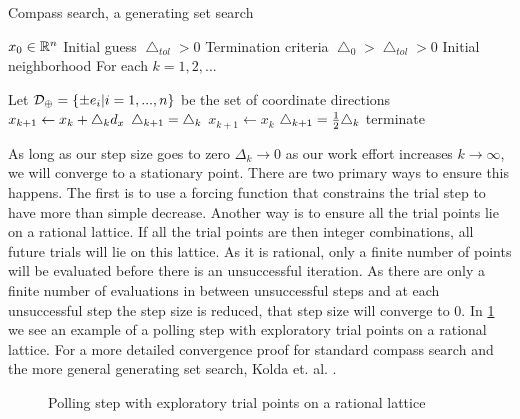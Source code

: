 \begin{algorithm}
\caption{Compass search, a generating set search}\label{dfo_genset}
\begin{algorithmic}
\State $x_0 \in \mathbb{R}^{n}$ Initial guess
\State $\bigtriangleup_{tol} >0$ Termination criteria
\State $\bigtriangleup_0 > \bigtriangleup_{tol} >0$ Initial neighborhood
\BState For each $k=1,2,...$

\State Let $\mathcal{D}_\oplus =\left\{ \pm e_i| i=1,...,n\right\}$ be the set of coordinate directions
\State $x_{k+1} \gets x_k + \bigtriangleup_k d_x$
\State $\bigtriangleup_{k+1} = \bigtriangleup_k$
\Else
\State $x_{k+1} \gets x_k$
\State $\bigtriangleup_{k+1} = \frac{1}{2} \bigtriangleup_k$
 terminate \EndIf
\EndIf
\EndProcedure
\end{algorithmic}
\end{algorithm}

As long as our step size goes to zero $\Delta_k \rightarrow 0$ as our work effort increases $k\rightarrow \infty$, we will converge to a stationary point.  There are two primary ways to ensure this happens.  The first is to use a forcing function that constrains the trial step to have more than simple decrease.  Another way is to ensure all the trial points lie on a rational lattice.  If all the trial points are then integer combinations, all future trials will lie on this lattice.  As it is rational, only a finite number of points will be evaluated before there is an unsuccessful iteration.  As there are only a finite number of evaluations in between unsuccessful steps and at each unsuccessful step the step size is reduced, that step size will converge to 0.  In \cref{fig:explore} we see an example of a polling step with exploratory trial points on a rational lattice. For a more detailed convergence proof for standard compass search and the more general generating set search, Kolda et. al. \cite{kolda_2003}.



\begin{figure}
\centering

\caption{Polling step with exploratory trial points on a rational lattice}\label{fig:explore}
\end{figure}




